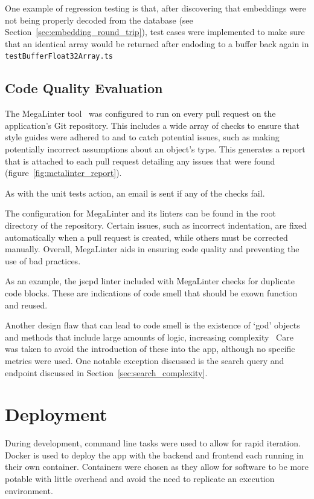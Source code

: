 One example of regression testing is that, after discovering that embeddings were
not being properly decoded from the database (see Section~\ref{sec:embedding_round_trip}),
test cases were implemented to make sure that an identical array would be returned
after endoding to a buffer back again in \texttt{testBufferFloat32Array.ts}

\subsection{Code Quality Evaluation}
The MegaLinter tool~\cite{vuillamy_megalinter_nodate} was configured to run on every pull request on the application's Git repository. This includes a wide array
of checks to ensure that style guides were adhered to and to catch potential issues, such as making potentially incorrect
assumptions about an object's type. This generates a report that is attached to each pull request detailing
any issues that were found (figure~\ref{fig:metalinter_report}).

As with the unit tests action, an email is sent if any of the checks fail.

The configuration for MegaLinter and its linters can be found in the root directory of the repository.
Certain issues, such as incorrect indentation, are fixed automatically when a pull request is created, while others
must be corrected manually. Overall, MegaLinter aids in ensuring code quality and preventing the use of bad practices.

As an example, the jscpd linter included with MegaLinter checks for duplicate code blocks. These are indications of code
smell that should be exown function and reused.~\cite{fowler_refactoring_1997}

Another design flaw that can lead to code smell is the existence of \enquote*{god} objects
and methods that include large amounts of logic, increasing complexity~\cite{marinescu_measurement_2005,vaucher_tracking_2009}
Care was taken to avoid the introduction of these into the \chef{} app, although no specific
metrics were used. One notable exception discussed is the search query and endpoint discussed in
Section~\ref{sec:search_complexity}.


\section{Deployment}

During development, command line tasks were used to allow for rapid iteration. Docker is used to deploy
the app with the backend and frontend each running in their own container. Containers were chosen as they
allow for software to be more potable with little overhead and avoid the need to replicate an execution
environment.~\cite{bernstein_containers_2014,vase_advantages_2015}

